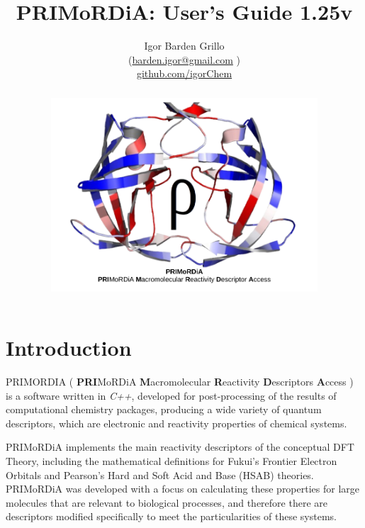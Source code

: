 \documentclass[a4paper,11pt]{refart}
\title{PRIMoRDiA: User's Guide 1.25v  }
\author{Igor Barden Grillo \\(\url{barden.igor@gmail.com} )\\\url{github.com/igorChem}}
\begin{document}
	\maketitle
	\begin{abstract}
		\hspace*{-1.4\leftmarginwidth}
		\begin{minipage}{\fullwidth}
			\begin{figure}[H]
				\begin{center}
					\includegraphics[width=7in]{logo_primordia}
				\end{center}
			\end{figure}
		\end{minipage}
	\end{abstract}
	\newpage
	\tableofcontents
	\newpage

	\section{Introduction}

	PRIMORDIA ( \textbf{PRI}MoRDiA \textbf{M}acromolecular \textbf{R}eactivity \textbf{D}escriptors \textbf{A}ccess ) is a software written in \emph{C++}, developed for post-processing of the results of computational chemistry packages, producing a wide variety of quantum descriptors, which are electronic and reactivity properties of chemical systems.

	PRIMoRDiA implements the main reactivity descriptors of the conceptual DFT Theory, including the mathematical definitions for Fukui's Frontier Electron Orbitals and Pearson's Hard and Soft Acid and Base (HSAB) theories. PRIMoRDiA was developed with a focus on calculating these properties for large molecules that are relevant to biological processes, and therefore there are descriptors modified specifically to meet the particularities of these systems.
\end{document}
